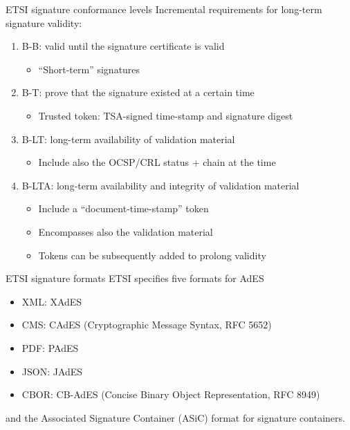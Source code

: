 \begin{frame}{ETSI signature conformance levels}
  Incremental requirements for long-term signature validity:
  \begin{enumerate}[<+(1)->]
    \item B-B: valid until the signature certificate is valid
    \begin{itemize}
      \item \enquote{Short-term} signatures
    \end{itemize}
    \item B-T: prove that the signature existed at a certain time
    \begin{itemize}
      \item Trusted token: TSA-signed time-stamp and signature digest
    \end{itemize}
    \item B-LT: long-term availability of validation material
    \begin{itemize}
      \item Include also the OCSP/CRL status + chain at the time
    \end{itemize}
    \item B-LTA: long-term availability and integrity of validation material
    \begin{itemize}
      \item Include a \enquote{document-time-stamp} token
      \item Encompasses also the validation material
      \item Tokens can be subsequently added to prolong validity
    \end{itemize}
  \end{enumerate}
\end{frame}

\begin{frame}{ETSI signature formats}
  ETSI specifies five formats for AdES
  \begin{itemize}[<+(1)->]
    \item XML: XAdES
    \item CMS: CAdES {\scriptsize (Cryptographic Message Syntax, RFC 5652)}
    \item PDF: PAdES
    \item JSON: JAdES
    \item CBOR: CB-AdES {\scriptsize (Concise Binary Object Representation, RFC 8949)}
  \end{itemize}

  \pause
  and the Associated Signature Container (ASiC) format for signature containers.
\end{frame}

